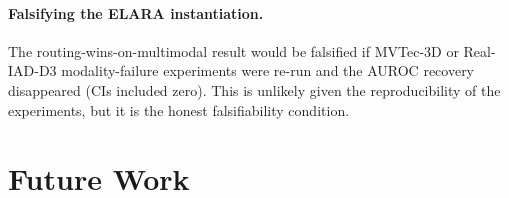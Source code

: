 \paragraph{Falsifying the ELARA instantiation.}
The routing-wins-on-multimodal result would be falsified if MVTec-3D or Real-IAD-D3
modality-failure experiments were re-run and the AUROC recovery disappeared (CIs
included zero).  This is unlikely given the reproducibility of the experiments, but
it is the honest falsifiability condition.

\section{Future Work}\label{sec:disc-future}

